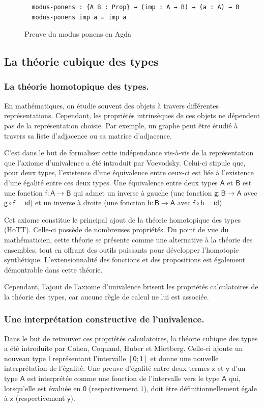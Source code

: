\documentclass[11pt]{article}
\begin{document}
\begin{figure}[h]
\centering
\begin{verbatim}
  modus-ponens : {A B : Prop} → (imp : A → B) → (a : A) → B
  modus-ponens imp a = imp a 
\end{verbatim}
\caption{Preuve du modus ponens en Agda}
\label{fig:agda-proof}
\end{figure}


\subsection{La théorie cubique des types}
\subsubsection{La théorie homotopique des types.}
En mathématiques, on étudie souvent des objets à travers différentes représentations. 
Cependant, les propriétés intrinsèques de ces objets ne dépendent pas de la représentation choisie. 
Par exemple, un graphe peut être étudié à travers sa liste d’adjacence ou sa matrice d’adjacence.

C’est dans le but de formaliser cette indépendance vis-à-vis de la représentation que l’axiome d’univalence a été introduit par Voevodsky. 
Celui-ci stipule que, pour deux types, l’existence d’une équivalence entre ceux-ci est liée à l’existence d’une égalité entre ces deux types. 
Une équivalence entre deux types $\mathsf{A}$ et $\mathsf{B}$ est une fonction $\mathsf{f : A \to B}$ 
qui admet un inverse à gauche (une fonction $\mathsf{g : B \to A}$ avec $\mathsf{g \circ f = id}$) 
et un inverse à droite (une fonction $\mathsf{h : B \to A}$ avec $\mathsf{f \circ h = id}$)

Cet axiome constitue le principal ajout de la théorie homotopique des types \cite{hottbook} (HoTT). 
Celle-ci possède de nombreuses propriétés. 
Du point de vue du mathématicien, cette théorie se présente comme une alternative à la théorie des ensembles, 
tout en offrant des outils puissants pour développer l’homotopie synthétique. 
L’extensionnalité des fonctions et des propositions est également démontrable dans cette théorie.

Cependant, l’ajout de l’axiome d’univalence brisent les propriétés calculatoires de la théorie des types, 
car aucune règle de calcul ne lui est associée.

\subsubsection{Une interprétation constructive de l'univalence.}
Dans le but de retrouver ces propriétés calculatoires, la théorie cubique des types \cite{cohen2016cubical} a été introduite par Cohen, Coquand, Huber et Mörtberg.
Celle-ci ajoute un nouveau type $\mathsf{I}$ représentant l’intervalle $\mathsf{[0;1]}$ et donne une nouvelle interprétation de l’égalité.
Une preuve d’égalité entre deux termes $\mathsf{x}$ et $\mathsf{y}$ d’un type $\mathsf{A}$ est interprétée comme une fonction de l’intervalle vers le type $\mathsf{A}$ qui,
lorsqu’elle est évaluée en $\mathsf{0}$ (respectivement $\mathsf{1}$), doit être définitionnellement égale à $\mathsf{x}$ (respectivement $\mathsf{y}$).
\end{document}
